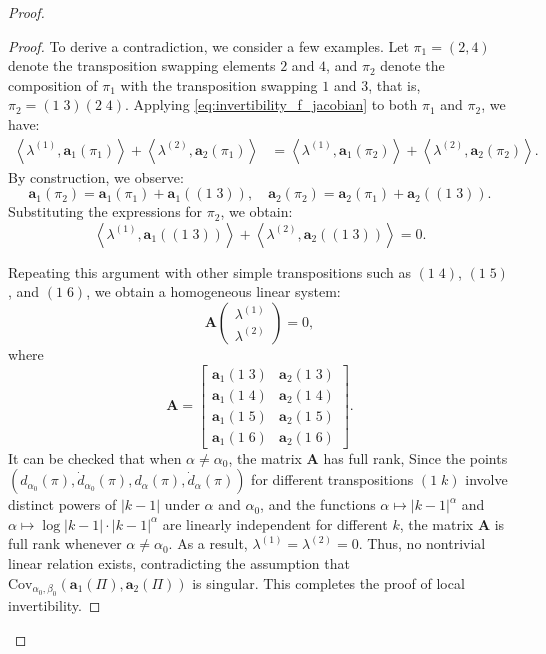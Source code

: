 \documentclass[10pt,a4paper]{amsart}
\begin{document}
\begin{proof}
\begin{proof}
To derive a contradiction, we consider a few examples. Let \(\pi_1=(2,4)\) denote the transposition swapping elements \(2\) and \(4\), and \(\pi_2\) denote the composition of \(\pi_1\) with the transposition swapping \(1\) and \(3\), that is, \(\pi_2 = (1\;3)(2\;4)\).
Applying \eqref{eq:invertibility_f_jacobian} to both \(\pi_1\) and \(\pi_2\), we have:
\begin{align*}
\left\langle \lambda^{(1)}, \boldsymbol{a}_1(\pi_1) \right\rangle + \left\langle \lambda^{(2)}, \boldsymbol{a}_2(\pi_1) \right\rangle &= 
\left\langle \lambda^{(1)}, \boldsymbol{a}_1(\pi_2) \right\rangle + \left\langle \lambda^{(2)}, \boldsymbol{a}_2(\pi_2) \right\rangle.
\end{align*}
By construction, we observe:
\[
\boldsymbol{a}_1(\pi_2) = \boldsymbol{a}_1(\pi_1) + \boldsymbol{a}_1((1\;3)),
\quad
\boldsymbol{a}_2(\pi_2) = \boldsymbol{a}_2(\pi_1) + \boldsymbol{a}_2((1\;3)).
\]
Substituting the expressions for \(\pi_2\), we obtain:
\[
\left\langle \lambda^{(1)}, \boldsymbol{a}_1((1\;3)) \right\rangle
+
\left\langle \lambda^{(2)}, \boldsymbol{a}_2((1\;3)) \right\rangle
= 0.
\]

Repeating this argument with other simple transpositions such as \((1\;4)\), \((1\;5)\), and \((1\;6)\), we obtain a homogeneous linear system:
\[
\boldsymbol{A}
\begin{pmatrix}
\lambda^{(1)} \\ \lambda^{(2)}
\end{pmatrix}
= 0,
\]
where
\[
\boldsymbol{A}
=
\begin{bmatrix}
\boldsymbol{a}_1(1\;3) & \boldsymbol{a}_2(1\;3) \\
\boldsymbol{a}_1(1\;4) & \boldsymbol{a}_2(1\;4) \\
\boldsymbol{a}_1(1\;5) & \boldsymbol{a}_2(1\;5) \\
\boldsymbol{a}_1(1\;6) & \boldsymbol{a}_2(1\;6)
\end{bmatrix}.
\]
It can be checked that when \(\alpha \neq \alpha_0\), the matrix \(\boldsymbol{A}\) has full rank, 
Since the points \((d_{\alpha_0}(\pi), \dot{d}_{\alpha_0}(\pi), d_{\alpha}(\pi), \dot{d}_{\alpha}(\pi))\) for different transpositions \((1\;k)\) involve distinct powers of \(|k-1|\) under \(\alpha\) and \(\alpha_0\), and the functions \(\alpha \mapsto |k-1|^\alpha\) and \(\alpha \mapsto \log|k-1|\cdot |k-1|^\alpha\) are linearly independent for different \(k\), the matrix \(\boldsymbol{A}\) is full rank whenever \(\alpha \neq \alpha_0\).
As a result, \(\lambda^{(1)} = \lambda^{(2)} = 0\).
Thus, no nontrivial linear relation exists, contradicting the assumption that \(\mathrm{Cov}_{\alpha_0,\beta_0}(\boldsymbol{a}_1(\Pi), \boldsymbol{a}_2(\Pi))\) is singular. This completes the proof of local invertibility.
\end{proof}


\end{proof}
\end{document}
